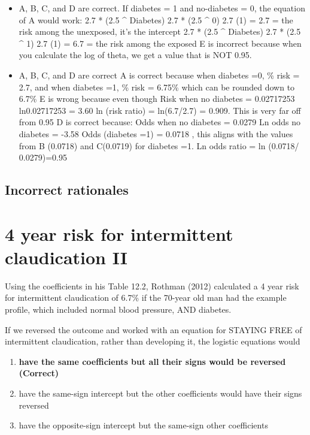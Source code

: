 \documentclass[letterpaper,9pt,twoside,printwatermark=false]{pinp}
\providecommand{\tightlist}{%
  \setlength{\itemsep}{0pt}\setlength{\parskip}{0pt}}
\begin{document}
\begin{itemize}
\tightlist
\item
  A, B, C, and D are correct. If diabetes = 1 and no-diabetes = 0, the
  equation of A would work: 2.7 * (2.5 \^{} Diabetes) 2.7 * (2.5 \^{} 0)
  2.7 (1) = 2.7 = the risk among the unexposed, it's the intercept 2.7 *
  (2.5 \^{} Diabetes) 2.7 * (2.5 \^{} 1) 2.7 (1) = 6.7 = the risk among
  the exposed E is incorrect because when you calculate the log of
  theta, we get a value that is NOT 0.95.
\item
  A, B, C, and D are correct A is correct because when diabetes =0, \%
  risk = 2.7, and when diabetes =1, \% risk = 6.75\% which can be
  rounded down to 6.7\% E is wrong because even though Risk when no
  diabetes = 0.02717253 ln0.02717253 = 3.60 ln (risk ratio) =
  ln(6.7/2.7) = 0.909. This is very far off from 0.95 D is correct
  because: Odds when no diabetes = 0.0279 Ln odds no diabetes = -3.58
  Odds (diabetes =1) = 0.0718 , this aligns with the values from B
  (0.0718) and C(0.0719) for diabetes =1. Ln odds ratio = ln (0.0718/
  0.0279)=0.95
\end{itemize}

\subsection{Incorrect rationales}\label{incorrect-rationales-7}

\section{4 year risk for intermittent claudication
II}\label{year-risk-for-intermittent-claudication-ii}

Using the coefficients in his Table 12.2, Rothman (2012) calculated a 4
year risk for intermittent claudication of 6.7\% if the 70-year old man
had the example profile, which included normal blood pressure, AND
diabetes.

If we reversed the outcome and worked with an equation for STAYING FREE
of intermittent claudication, rather than developing it, the logistic
equations would

\begin{enumerate}
\def\labelenumi{\alph{enumi}.}
\tightlist
\item
  \textbf{have the same coefficients but all their signs would be
  reversed (Correct)}
\item
  have the same-sign intercept but the other coefficients would have
  their signs reversed
\item
  have the opposite-sign intercept but the same-sign other coefficients
\end{enumerate}
\end{document}

